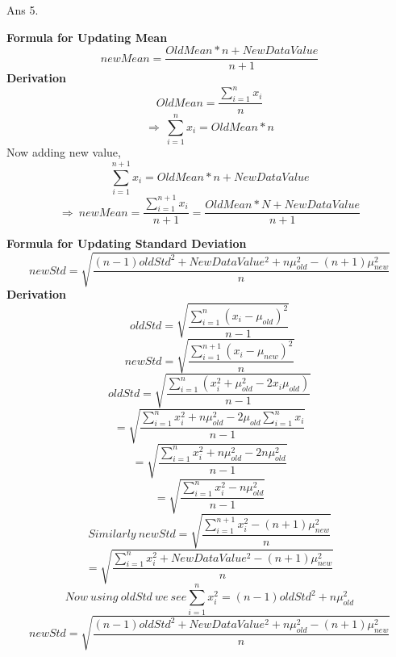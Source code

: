 \documentclass[11pt]{article}
\begin{document}
Ans 5.\begin{center}
\textbf{Formula for Updating Mean}
\vspace{20px}
$$newMean = \frac{OldMean*n + New DataValue}{n+1}$$
\textbf{Derivation}
\vspace{20px}
$$OldMean = \frac{\sum\limits_{i=1}^nx_i}{n}$$
$$\Rightarrow\ \sum\limits_{i=1}^nx_i = OldMean*n$$
Now adding new value,
$$\sum\limits_{i=1}^{n+1}x_i=OldMean*n + NewDataValue$$
$$\Rightarrow\ newMean = \frac{\sum\limits_{i=1}^{n+1}x_i}{n+1}=\frac{OldMean*N + New DataValue}{n+1}$$
\vspace{40px}

\textbf{Formula for Updating Standard Deviation}
\vspace{20px}
$$newStd=\sqrt{\frac{(n-1)oldStd^2 + NewDataValue^2 + n\mu_{old}^2 - (n+1)\mu_{new}^2}{n}}$$
\textbf{Derivation}
\vspace{20px}
$$oldStd=\sqrt{\frac{\sum\limits_{i=1}^n(x_i-\mu_{old})^2}{n-1}}$$
$$newStd=\sqrt{\frac{\sum\limits_{i=1}^{n+1}(x_i-\mu_{new})^2}{n}}$$
$$oldStd=\sqrt{\frac{\sum\limits_{i=1}^n(x_i^2+\mu_{old}^2-2x_i\mu_{old})}{n-1}}$$
$$=\sqrt{\frac{\sum\limits_{i=1}^nx_i^2+n\mu_{old}^2-2\mu_{old}\sum\limits_{i=1}^nx_i}{n-1}}$$
$$=\sqrt{\frac{\sum\limits_{i=1}^nx_i^2+n\mu_{old}^2-2n\mu_{old}^2}{n-1}}$$
$$=\sqrt{\frac{\sum\limits_{i=1}^nx_i^2-n\mu_{old}^2}{n-1}}$$
$$Similarly\ newStd=\sqrt{\frac{\sum\limits_{i=1}^{n+1}x_i^2-(n+1)\mu_{new}^2}{n}}$$
$$=\sqrt{\frac{\sum\limits_{i=1}^{n}x_i^2+NewDataValue^2-(n+1)\mu_{new}^2}{n}}$$
$$Now\ using\ oldStd\ we\ see \sum\limits_{i=1}^{n}x_i^2 = (n-1)oldStd^2 + n\mu_{old}^2$$
$$newStd=\sqrt{\frac{(n-1)oldStd^2 + NewDataValue^2 + n\mu_{old}^2 - (n+1)\mu_{new}^2}{n}}$$
\end{center}
\end{document}

